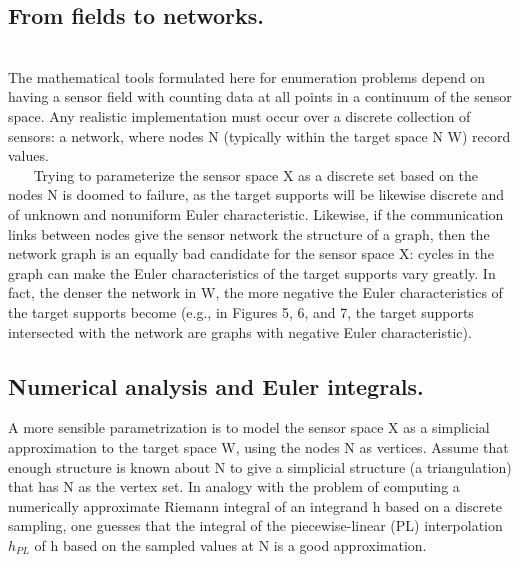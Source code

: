 \documentclass{article}
\begin{document}
\begin{flushleft}

\section{From fields to networks.}
\\
The mathematical tools formulated here for enumeration
problems depend on having a sensor field with counting data at all points
in a continuum of the sensor space. Any realistic implementation must occur over a
discrete collection of sensors: a network, where nodes N (typically within the target
space N \subset W) record values.
\\
~~~ Trying to parameterize the sensor space X as a discrete set based on the nodes N
is doomed to failure, as the target supports will be likewise discrete and of unknown
and nonuniform Euler characteristic. Likewise, if the communication links between
nodes give the sensor network the structure of a graph, then the network graph is an
equally bad candidate for the sensor space X: cycles in the graph can make the Euler
characteristics of the target supports vary greatly. In fact, the denser the network in
W, the more negative the Euler characteristics of the target supports become (e.g.,
in Figures 5, 6, and 7, the target supports intersected with the network are graphs
with negative Euler characteristic).
\subsection{Numerical analysis and Euler integrals.}
A more sensible parametrization
is to model the sensor space X as a simplicial approximation to the target space
W, using the nodes N as vertices. Assume that enough structure is known about
N to give a simplicial structure (a triangulation) that has N as the vertex set. In
analogy with the problem of computing a numerically approximate Riemann integral
of an integrand h based on a discrete sampling, one guesses that the integral of the
piecewise-linear (PL) interpolation $h_{PL}$ of h based on the sampled values at N is a
good approximation.
\end{flushleft}
\vspace{.5in}
\end{document}
